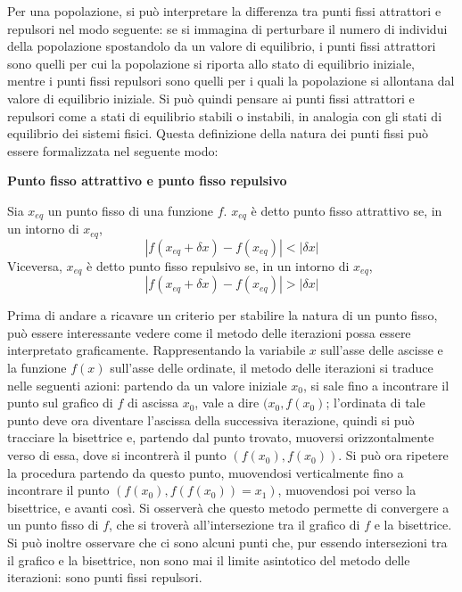 Per una popolazione, si può interpretare la differenza tra punti fissi attrattori e repulsori nel modo seguente: se si immagina di perturbare il numero di individui della popolazione spostandolo da un valore di equilibrio, i punti fissi attrattori sono quelli per cui la popolazione si riporta allo stato di equilibrio iniziale, mentre i punti fissi repulsori sono quelli per i quali la popolazione si allontana dal valore di equilibrio iniziale. Si può quindi pensare ai punti fissi attrattori e repulsori come a stati di equilibrio stabili o instabili, in analogia con gli stati di equilibrio dei sistemi fisici. Questa definizione della natura dei punti fissi può essere formalizzata nel seguente modo:
\begin{definizione}{\textnormal{\textbf{Punto fisso attrattivo e punto fisso repulsivo}}}

    Sia $x_{eq}$ un punto fisso di una funzione $f$. $x_{eq}$ è detto \textnormal{punto fisso attrattivo} se, in un intorno di $x_{eq}$, $$\left|f(x_{eq} + \delta x) - f(x_{eq})\right| < \left|\delta x\right|$$
    Viceversa, $x_{eq}$ è detto punto fisso repulsivo se, in un intorno di $x_{eq}$, $$\left|f(x_{eq} + \delta x) - f(x_{eq})\right| > \left|\delta x\right|$$
    \label{def:attrattore_repulsore}
\end{definizione}

Prima di andare a ricavare un criterio per stabilire la natura di un punto fisso, può essere interessante vedere come il metodo delle iterazioni possa essere interpretato graficamente. Rappresentando la variabile $x$ sull'asse delle ascisse e la funzione $f(x)$ sull'asse delle ordinate, il metodo delle iterazioni si traduce nelle seguenti azioni: partendo da un valore iniziale $x_0$, si sale fino a incontrare il punto sul grafico di $f$ di ascissa $x_0$, vale a dire $(x_0, f(x_0)$; l'ordinata di tale punto deve ora diventare l'ascissa della successiva iterazione, quindi si può tracciare la bisettrice e, partendo dal punto trovato, muoversi orizzontalmente verso di essa, dove si incontrerà il punto $(f(x_0), f(x_0))$. Si può ora ripetere la procedura partendo da questo punto, muovendosi verticalmente fino a incontrare il punto $\left(f(x_0 ) , f(f(x_0)) = x_1 \right)$, muovendosi poi verso la bisettrice, e avanti così. Si osserverà che questo metodo permette di convergere a un punto fisso di $f$, che si troverà all'intersezione tra il grafico di $f$ e la bisettrice. Si può inoltre osservare che ci sono alcuni punti che, pur essendo intersezioni tra il grafico e la bisettrice, non sono mai il limite asintotico del metodo delle iterazioni: sono punti fissi repulsori.

